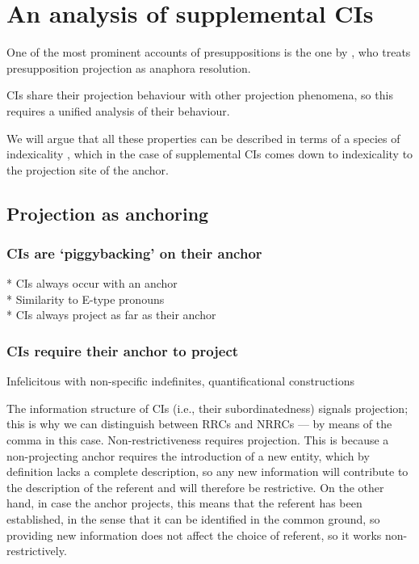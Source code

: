 \section{An analysis of supplemental CIs}

One of the most prominent accounts of presuppositions is the one by
\citet{sandt1992presupposition}, who treats presupposition projection as
anaphora resolution.

CIs share their projection behaviour with other projection phenomena, so this
requires a unified analysis of their behaviour.

%

We will argue that all these properties can be described in terms of
a species of indexicality \citep[cf.][]{amaral2007review}, which in the case
of supplemental CIs comes down to indexicality to the projection site of the
anchor.

\subsection{Projection as anchoring}

\subsubsection{CIs are `piggybacking' on their anchor}

* CIs always occur with an anchor\\
* Similarity to E-type pronouns\\
* CIs always project as far as their anchor


\subsubsection{CIs require their anchor to project}

Infelicitous with non-specific indefinites, quantificational constructions

The information structure of CIs (i.e., their subordinatedness) signals
projection; this is why we can distinguish between RRCs and NRRCs --- by
means of the comma in this case. Non-restrictiveness requires projection.
This is because a non-projecting anchor requires the introduction of a new
entity, which by definition lacks a complete description, so any new
information will contribute to the description of the referent and will
therefore be restrictive. On the other hand, in case the anchor projects,
this means that the referent has been established, in the sense that it can
be identified in the common ground, so providing new information does not
affect the choice of referent, so it works non-restrictively.

